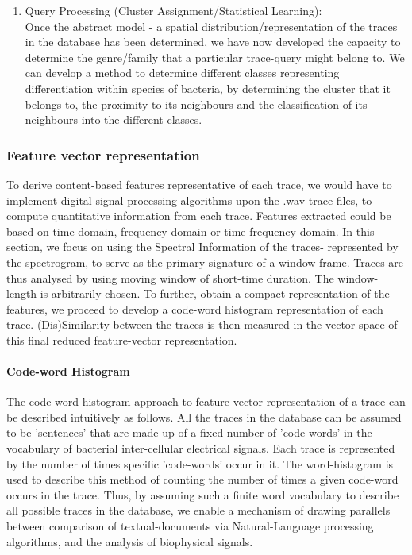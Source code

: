 \documentclass[10pt]{article}
\begin{document}
\begin{enumerate}
\item Query Processing (Cluster Assignment/Statistical Learning):\\
Once the abstract model - a spatial distribution/representation of the traces in the database has been determined, we have now developed the capacity to determine the genre/family that a particular trace-query might belong to. We can develop a method to determine different classes representing differentiation within species of bacteria, by determining the cluster that it belongs to, the proximity to its neighbours and the classification of its neighbours into the different classes. 
\end{enumerate}

\subsubsection{Feature vector representation}

To derive content-based features representative of each trace, we would have to implement digital signal-processing algorithms upon the .wav trace files, to compute quantitative information from each trace. Features extracted could be based on time-domain, frequency-domain or time-frequency domain. In this section, we focus on using the Spectral Information of the traces- represented by the spectrogram, to serve as the primary signature of a window-frame. 
Traces are thus analysed by using moving window of short-time duration. The window-length is arbitrarily chosen.
To further, obtain a compact representation of the features, we proceed to develop a code-word histogram representation of each trace. (Dis)Similarity between the traces is then measured in the vector space of this final reduced feature-vector representation. 


\paragraph{Code-word Histogram}
The code-word histogram \cite{codewordHist} approach to feature-vector representation of a trace can be described intuitively as follows. All the traces in the database can be assumed to be 'sentences' that are made up of a fixed number of 'code-words' in the vocabulary of bacterial inter-cellular electrical signals. Each trace is represented by the number of times specific 'code-words' occur in it. The word-histogram is used to describe this method of counting the number of times a given code-word occurs in the trace. Thus, by assuming such a finite word vocabulary to describe all possible traces in the database, we enable a  mechanism of drawing parallels between comparison of textual-documents via Natural-Language processing algorithms, and the analysis of biophysical signals. 
\end{document}
